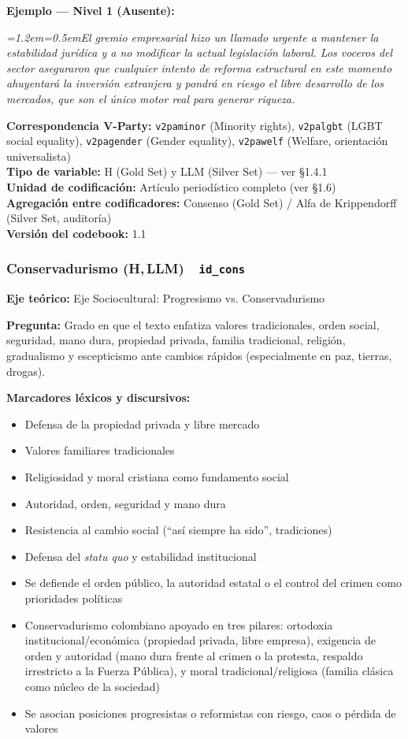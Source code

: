 \documentclass[11pt,letterpaper]{article}
\newcommand{\metaficha}[1]{%
  \par\smallskip\noindent\footnotesize\color{gris}%
  \textbf{Correspondencia V-Party:} #1\\
  \textbf{Tipo de variable:} H (Gold Set) y LLM (Silver Set) — ver §1.4.1\\
  \textbf{Unidad de codificación:} Artículo periodístico completo (ver §1.6)\\
  \textbf{Agregación entre codificadores:} Consenso (Gold Set) / Alfa de Krippendorff (Silver Set, auditoría)\\
  \textbf{Versión del codebook:} 1.1\par\normalsize\color{black}\medskip}
\newcommand{\ejemplo}[2]{%
  \par\smallskip\noindent\textbf{Ejemplo — #1:}\par\nopagebreak
  \begingroup\itshape\small\leftskip=1.2em\rightskip=0.5em\noindent #2\par\endgroup\smallskip}
\newcommand{\dimtitulo}[2]{\subsubsection*{#1 \normalfont\small\color{gris}(H,\,LLM)\ \ \texttt{#2}}%
  \addcontentsline{toc}{subsubsection}{#1}}
\begin{document}
\ejemplo{Nivel 1 (Ausente)}{El gremio empresarial hizo un llamado urgente a mantener la estabilidad
jurídica y a no modificar la actual legislación laboral. Los voceros del sector aseguraron que cualquier intento
de reforma estructural en este momento ahuyentará la inversión extranjera y pondrá en riesgo el libre
desarrollo de los mercados, que son el único motor real para generar riqueza.}

\metaficha{\texttt{v2paminor} (Minority rights), \texttt{v2palgbt} (LGBT social equality),
\texttt{v2pagender} (Gender equality), \texttt{v2pawelf} (Welfare, orientación universalista)}

\dimtitulo{Conservadurismo}{id\_cons}
\textbf{Eje teórico:} Eje Sociocultural: Progresismo vs. Conservadurismo

\textbf{Pregunta:} Grado en que el texto enfatiza valores tradicionales, orden social, seguridad, mano dura,
propiedad privada, familia tradicional, religión, gradualismo y escepticismo ante cambios rápidos
(especialmente en paz, tierras, drogas).

\textbf{Marcadores léxicos y discursivos:}
\begin{itemize}
\item Defensa de la propiedad privada y libre mercado
\item Valores familiares tradicionales
\item Religiosidad y moral cristiana como fundamento social
\item Autoridad, orden, seguridad y mano dura
\item Resistencia al cambio social (“así siempre ha sido”, tradiciones)
\item Defensa del \emph{statu quo} y estabilidad institucional
\item Se defiende el orden público, la autoridad estatal o el control del crimen como prioridades políticas
\item Conservadurismo colombiano apoyado en tres pilares: ortodoxia institucional/económica (propiedad
privada, libre empresa), exigencia de orden y autoridad (mano dura frente al crimen o la protesta, respaldo
irrestricto a la Fuerza Pública), y moral tradicional/religiosa (familia clásica como núcleo de la sociedad)
\item Se asocian posiciones progresistas o reformistas con riesgo, caos o pérdida de valores
\end{itemize}
\end{document}
